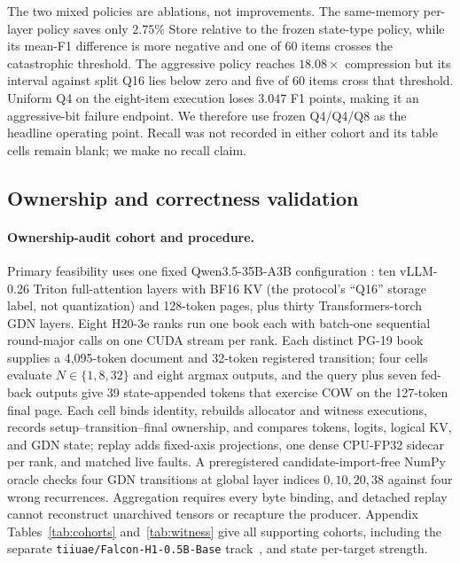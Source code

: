 \documentclass{article}
\begin{document}
The two mixed policies are ablations, not improvements.  The same-memory
per-layer policy saves only $2.75\%$ Store relative to the frozen state-type
policy, while its mean-F1 difference is more negative and one of 60 items
crosses the catastrophic threshold.  The aggressive policy reaches
$18.08\times$ compression but its interval against split Q16 lies below zero and
five of 60 items cross that threshold.  Uniform Q4 on the eight-item execution
loses $3.047$ F1 points, making it an aggressive-bit failure endpoint.  We
therefore use frozen Q4/Q4/Q8 as the headline operating point.  Recall was not
recorded in either cohort and its table cells remain blank; we make no recall
claim.

\subsection{Ownership and correctness validation}
\label{sec:correctness}
\label{sec:results}

\paragraph{Ownership-audit cohort and procedure.}
Primary feasibility uses one fixed Qwen3.5-35B-A3B configuration
\citep{qwen2026qwen35,qwen2026qwen35modelcard}: ten vLLM-0.26 Triton
full-attention layers with BF16 KV (the protocol's ``Q16'' storage label, not
quantization) and 128-token pages, plus thirty Transformers-torch GDN layers.
Eight H20-3e ranks run one book each with batch-one sequential round-major calls
on one CUDA stream per rank.  Each distinct PG-19
book~\citep{rae2020compressive} supplies a 4,095-token document and 32-token
registered transition; four cells evaluate $N\in\{1,8,32\}$ and eight argmax
outputs, and the query plus seven fed-back outputs give 39 state-appended tokens
that exercise COW on the 127-token final page.  Each cell binds identity,
rebuilds allocator and witness executions, records setup--transition--final
ownership, and compares tokens, logits, logical KV, and GDN state; replay adds
fixed-axis projections, one dense CPU-FP32 sidecar per rank, and matched live
faults.  A preregistered candidate-import-free NumPy oracle checks four GDN
transitions at global layer indices $0,10,20,38$ against four wrong recurrences.
Aggregation requires every byte binding, and detached replay cannot reconstruct
unarchived tensors or recapture the producer.  Appendix
Tables~\ref{tab:cohorts} and~\ref{tab:witness} give all supporting cohorts,
including the separate \texttt{tiiuae/Falcon-H1-0.5B-Base}
track~\citep{zuo2025falconh1}, and state per-target strength.
\end{document}
